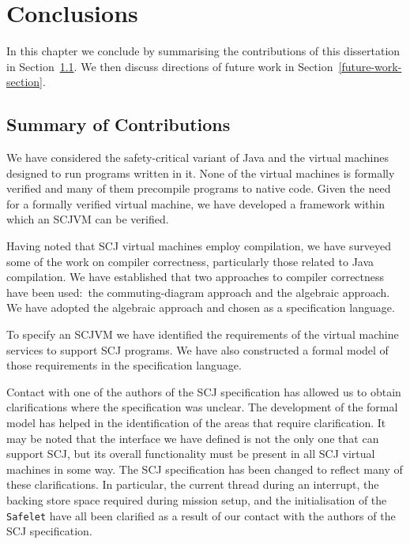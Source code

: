 \chapter{Conclusions}
\label{conclusions-chapter}
In this chapter we conclude by summarising the contributions of this
dissertation in Section~\ref{summary-section}.
We then discuss directions of future work in
Section~\ref{future-work-section}.

\section{Summary of Contributions}
\label{summary-section}

 We have considered
the safety-critical variant of Java and the virtual machines designed to run
programs written in it.
None of the virtual machines is formally verified and
many of them precompile programs to native code.
Given the need for a formally verified virtual machine, we have
developed a framework within which an SCJVM can be verified.

Having noted that SCJ virtual machines employ compilation, we have
surveyed some of the work on compiler correctness, particularly those
related to Java compilation.
We have established that two approaches to compiler correctness have
been used:~the commuting-diagram approach and the algebraic approach.
We have adopted the algebraic approach and chosen \Circus{} as a specification language.

To specify an SCJVM we have identified the requirements of the virtual
machine services to support SCJ programs.
We have also constructed a formal model of those requirements in the
\Circus{} specification language.

Contact with one of the authors of the SCJ specification has allowed
us to obtain clarifications where the specification was unclear.
The development of the formal model has helped in the identification
of the areas that require clarification.
It may be noted that the interface we have defined is not the only one
that can support SCJ, but its overall functionality must be present in
all SCJ virtual machines in some way.
The SCJ specification has been changed to reflect many of
these clarifications.
In particular, the current thread during an interrupt, the backing
store space required during mission setup, and the initialisation of
the \texttt{Safelet} have all been clarified as a result of our
contact with the authors of the SCJ specification.

